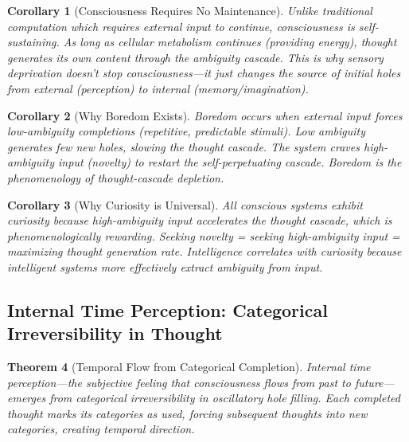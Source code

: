 \documentclass[11pt,a4paper]{article}
\newtheorem{theorem}{Theorem}
\newtheorem{corollary}[theorem]{Corollary}
\begin{document}
\begin{corollary}[Consciousness Requires No Maintenance]
Unlike traditional computation which requires external input to continue, consciousness is self-sustaining. As long as cellular metabolism continues (providing energy), thought generates its own content through the ambiguity cascade. This is why sensory deprivation doesn't stop consciousness—it just changes the source of initial holes from external (perception) to internal (memory/imagination).
\end{corollary}

\begin{corollary}[Why Boredom Exists]
Boredom occurs when external input forces low-ambiguity completions (repetitive, predictable stimuli). Low ambiguity generates few new holes, slowing the thought cascade. The system craves high-ambiguity input (novelty) to restart the self-perpetuating cascade. Boredom is the phenomenology of thought-cascade depletion.
\end{corollary}

\begin{corollary}[Why Curiosity is Universal]
All conscious systems exhibit curiosity because high-ambiguity input accelerates the thought cascade, which is phenomenologically rewarding. Seeking novelty = seeking high-ambiguity input = maximizing thought generation rate. Intelligence correlates with curiosity because intelligent systems more effectively extract ambiguity from input.
\end{corollary}

\subsection{Internal Time Perception: Categorical Irreversibility in Thought}

\begin{theorem}[Temporal Flow from Categorical Completion]
\label{thm:internal_time}
Internal time perception—the subjective feeling that consciousness flows from past to future—emerges from categorical irreversibility in oscillatory hole filling. Each completed thought marks its categories as used, forcing subsequent thoughts into new categories, creating temporal direction.
\end{theorem}
\end{document}

